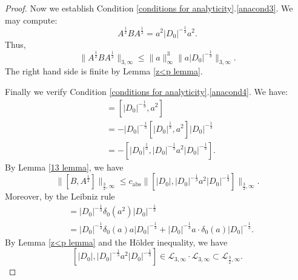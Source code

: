 \begin{proof}
        Now we establish Condition \ref{conditions for analyticity}.\eqref{anacond3}. We may compute:
        $$A^{\frac12}BA^{\frac12}=a^2|D_0|^{-\frac13}a^2.$$
        Thus,
        $$\|A^{\frac12}BA^{\frac12}\|_{3,\infty}\leq\|a\|_{\infty}^3\|a|D_0|^{-\frac13}\|_{3,\infty}.$$
        The right hand side is finite by Lemma \ref{z<p lemma}.

        Finally we verify Condition \ref{conditions for analyticity}.\eqref{anacond4}. We have:
        \begin{align*}
            [B,A^{\frac12}] &= [|D_0|^{-\frac13},a^2]\\
                            &= -|D_0|^{-\frac13}[|D_0|^{\frac13},a^2]|D_0|^{-\frac13}\\
                            &= -[|D_0|^{\frac13},|D_0|^{-\frac13}a^2|D_0|^{-\frac13}].
        \end{align*}
        By Lemma \ref{13 lemma}, we have
        $$\|[B,A^{\frac12}]\|_{\frac{3}{2},\infty}\leq c_{\mathrm{abs}}\|[|D_0|,|D_0|^{-\frac13}a^2|D_0|^{-\frac13}]\|_{\frac{3}{2},\infty}.$$
        Moreover, by the Leibniz rule
        \begin{align*}
            [|D_0|,|D_0|^{-\frac13}a^2|D|^{-\frac13}] &= |D_0|^{-\frac13}\delta_0(a^2)|D_0|^{-\frac13}\\
                                                      &= |D_0|^{-\frac13}\delta_0(a)a|D_0|^{-\frac13}+|D_0|^{-\frac13}a\cdot\delta_0(a)|D_0|^{-\frac13}.
        \end{align*}
        By Lemma \ref{z<p lemma} and the H\"older inequality, we have
        $$[|D_0|,|D_0|^{-\frac13}a^2|D_0|^{-\frac13}]\in\mathcal{L}_{3,\infty}\cdot\mathcal{L}_{3,\infty}\subset\mathcal{L}_{\frac{3}{2},\infty}.$$
    \end{proof}
    
